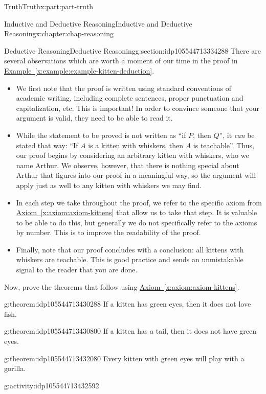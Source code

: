 \documentclass[oneside,10pt,]{book}
\newcommand{\xreffont}{\relax}
\numberwithin{equation}{section}
\begin{document}
\begin{partptx}{Truth}{}{Truth}{}{}{x:part:part-truth}
\begin{chapterptx}{Inductive and Deductive Reasoning}{}{Inductive and Deductive Reasoning}{}{}{x:chapter:chap-reasoning}
\begin{sectionptx}{Deductive Reasoning}{}{Deductive Reasoning}{}{}{g:section:idp105544713334288}
There are several observations which are worth a moment of our time in the proof in \hyperref[x:example:example-kitten-deduction]{Example~{\xreffont\ref{x:example:example-kitten-deduction}}}.%
%
\begin{itemize}[label=\textbullet]
\item{}We first note that the proof is written using standard conventions of academic writing, including complete sentences, proper punctuation and capitalization, etc. This is important! In order to convince someone that your argument is valid, they need to be able to read it.%
\item{}While the statement to be proved is not written as ``if \(P\), then \(Q\)'', it \emph{can} be stated that way: ``If \(A\) is a kitten with whiskers, then \(A\) is teachable''. Thus, our proof begins by considering an arbitrary kitten with whiskers, who we name Arthur. We observe, however, that there is nothing special about Arthur that figures into our proof in a meaningful way, so the argument will apply just as well to any kitten with whiskers we may find.%
\item{}In each step we take throughout the proof, we refer to the specific axiom from \hyperref[x:axiom:axiom-kittens]{Axiom~{\xreffont\ref{x:axiom:axiom-kittens}}} that allow us to take that step. It is valuable to be able to do this, but generally we do not specifically refer to the axioms by number. This is to improve the readability of the proof.%
\item{}Finally, note that our proof concludes with a conclusion: all kittens with whiskers are teachable. This is good practice and sends an unmistakable signal to the reader that you are done.%
\end{itemize}
Now, prove the theorems that follow using \hyperref[x:axiom:axiom-kittens]{Axiom~{\xreffont\ref{x:axiom:axiom-kittens}}}.%
\begin{theorem}{}{}{g:theorem:idp105544713430288}%
If a kitten has green eyes, then it does not love fish.%
\end{theorem}
\begin{theorem}{}{}{g:theorem:idp105544713430800}%
If a kitten has a tail, then it does not have green eyes.%
\end{theorem}
\begin{theorem}{}{}{g:theorem:idp105544713432080}%
Every kitten with green eyes will play with a gorilla.%
\end{theorem}
\begin{activity}{}{g:activity:idp105544713432592}%

\end{activity}
\end{sectionptx}
\end{chapterptx}
\end{partptx}
\end{document}
